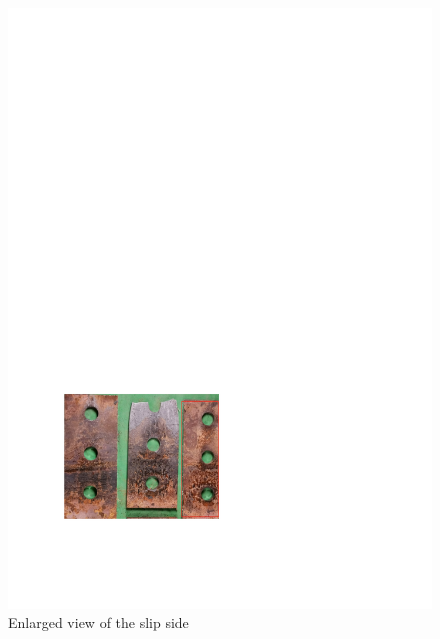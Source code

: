 \begin{figure}[htbp]
    \centering
    \begin{minipage}[t]{0.45\textwidth}
    \includegraphics[width=\linewidth]{imgs/ch3/fig3-29.pdf}
    \caption{Enlarged view of the slip side}
    \label{fig3-29}
    \end{minipage}
    \begin{minipage}[t]{0.45\textwidth}

\end{minipage}
\end{figure}
